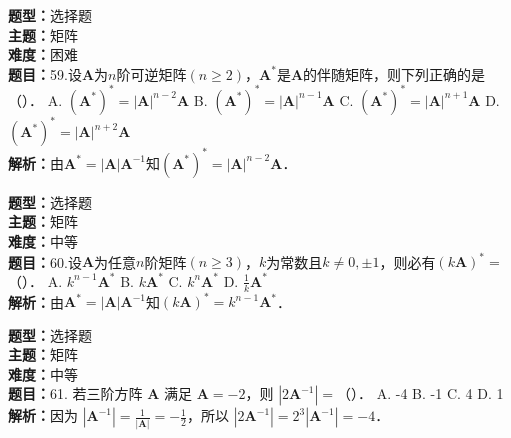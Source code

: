 \documentclass{ctexart}
\newenvironment{question}[5]{%
	\noindent\textbf{题型：}#1\\
	\textbf{主题：}#2\\
	\textbf{难度：}#3\\
	\textbf{题目：}#4\\
	\textbf{解析：}#5\\
	\vspace{1em}
}{}
\begin{document}
	\begin{question}
		{选择题}
		{矩阵}
		{困难}
		{59.设\(\mathbf{A}\)为\(n\)阶可逆矩阵\((n \geq 2)\)，\(\mathbf{A}^*\)是\(\mathbf{A}\)的伴随矩阵，则下列正确的是（）．
			A. \(\left(\mathbf{A}^*\right)^*=|\mathbf{A}|^{n-2} \mathbf{A}\)
			B. \(\left(\mathbf{A}^*\right)^*=|\mathbf{A}|^{n-1} \mathbf{A}\)
			C. \(\left(\mathbf{A}^*\right)^*=|\mathbf{A}|^{n+1} \mathbf{A}\)
			D. \(\left(\mathbf{A}^*\right)^*=|\mathbf{A}|^{n+2} \mathbf{A}\)}
		{由\(\mathbf{A}^*=|\mathbf{A}| \mathbf{A}^{-1}\)知\(\left(\mathbf{A}^*\right)^*=|\mathbf{A}|^{n-2} \mathbf{A}\)．}
	\end{question}
	
	\begin{question}
		{选择题}
		{矩阵}
		{中等}
		{60.设\(\mathbf{A}\)为任意\(n\)阶矩阵\((n \geq 3)\)，\(k\)为常数且\(k \neq 0, \pm 1\)，则必有\((k \mathbf{A})^*=\)（）．
			A. \(k^{n-1} \mathbf{A}^*\)
			B. \(k \mathbf{A}^*\)
			C. \(k^n \mathbf{A}^*\)
			D. \(\frac{1}{k} \mathbf{A}^*\)}
		{由\(\mathbf{A}^*=|\mathbf{A}| \mathbf{A}^{-1}\)知\((k \mathbf{A})^*=k^{n-1} \mathbf{A}^*\)．}
	\end{question}
	\begin{question}
		{选择题}
		{矩阵}
		{中等}
		{61. 若三阶方阵 \(\mathbf{A}\) 满足 \(\mathbf{A}=-2\)，则 \(\left|2 \mathbf{A}^{-1}\right|=\)（）．
			A. -4
			B. -1
			C. 4
			D. 1}
		{因为 \(\left|\mathbf{A}^{-1}\right|=\frac{1}{|\mathbf{A}|}=-\frac{1}{2}\)，所以 \(\left|2 \mathbf{A}^{-1}\right|=2^3\left|\mathbf{A}^{-1}\right|=-4\)．}
	\end{question}
	
\end{document}
